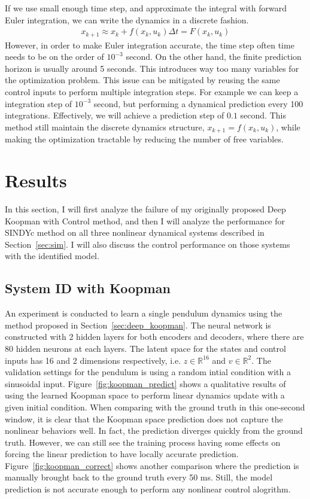 \documentclass[10pt,twocolumn]{article}
\begin{document}
If we use small enough time step, and approximate the integral with forward Euler integration,
we can write the dynamics in a discrete fashion.
\begin{gather}
  x_{k+1} \approx x_k + f(x_k, u_k) \Delta t = F(x_k, u_k)
\end{gather}
However, in order to make Euler integration accurate, the time step often time needs to be
on the order of $10^{-3}$ second. On the other hand, the finite prediction horizon is
usually around 5 seconds.
This introduces way too many variables for the optimization problem. This issue can be
mitigated by reusing the same control inputs to perform multiple integration steps. For example
we can keep a integration step of $10^{-3}$ second, but performing a dynamical prediction
every 100 integrations. Effectively, we will achieve a prediction step of $0.1$ second. This
method still maintain the discrete dynamics structure, $x_{k+1} = f(x_k, u_k)$, while making
the optimization tractable by reducing the number of free variables.

\section{Results}

In this section, I will first analyze the failure of my originally proposed Deep Koopman with
Control method, and then I will analyze the performance for SINDYc method
on all three nonlinear dynamical systems described in Section~\ref{sec:sim}. I will also discuss
the control performance on those systems with the identified model.

\subsection{System ID with Koopman}

An experiment is conducted to learn a single pendulum dynamics using the method proposed
in Section~\ref{sec:deep_koopman}. The neural network is constructed with 2 hidden layers
for both encoders and decoders, where there are 80 hidden neurons at each layers. The
latent space for the states and control inputs has 16 and 2 dimensions respectively, i.e.
$z \in \mathbb{R}^{16}$ and $v \in \mathbb{R}^2$. The validation settings for the pendulum
is using a random intial condition with a sinusoidal input. Figure~\ref{fig:koopman_predict}
shows a qualitative results of using the learned Koopman space to perform linear dynamics update
with a given initial condition. When comparing with the ground truth in this one-second window,
it is clear that the
Koopman space prediction does not capture the nonlinear behaviors well. In fact, the prediction
diverges quickly from the ground truth. However, we can still see the training process
having some effects on forcing the linear prediction to have locally accurate prediction.
Figure~\ref{fig:koopman_correct} shows another comparison where the prediction is manually
brought back to the ground truth every 50 ms. Still, the model prediction is not accurate enough
to perform any nonlinear control alogrithm.
\end{document}
